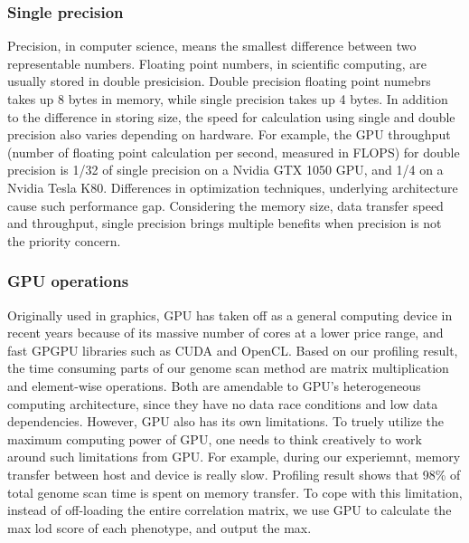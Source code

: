 \documentclass[9pt,twocolumn,twoside,lineno]{gsag3jnl}
\begin{document}
 
\subsubsection{Single precision}
Precision, in computer science, means the smallest difference between two representable numbers.
Floating point numbers, in scientific computing, are usually stored in double presicision. 
Double precision floating point numebrs takes up 8 bytes in memory, while single precision takes up 4 bytes. 
In addition to the difference in storing size, the speed for calculation using single and double precision also varies depending on hardware. 
For example, the GPU throughput (number of floating point calculation per second, measured in FLOPS) for double precision is 1/32 of single precision on a Nvidia GTX 1050 GPU, and 1/4 on a Nvidia Tesla K80. 
Differences in optimization techniques, underlying architecture cause such performance gap. 
Considering the memory size, data transfer speed and throughput, single precision brings multiple benefits when precision is not the priority concern. 


\subsubsection{GPU operations}

Originally used in graphics, GPU has taken off as a general computing device in recent years because of its massive number of cores at a lower price range, and fast GPGPU libraries such as CUDA and OpenCL.
Based on our profiling result, the time consuming parts of our genome scan method are matrix multiplication and element-wise operations. 
Both are amendable to GPU's heterogeneous computing architecture, since they have no data race conditions and low data dependencies. 
However, GPU also has its own limitations. 
To truely utilize the maximum computing power of GPU, one needs to think creatively to work around such limitations from GPU. 
For example, during our experiemnt, memory transfer between host and device is really slow. 
Profiling result shows that 98\% of total genome scan time is spent on memory transfer. 
To cope with this limitation, instead of off-loading the entire correlation matrix, we use GPU to calculate the max lod score of each phenotype, and output the max. 
\end{document}
